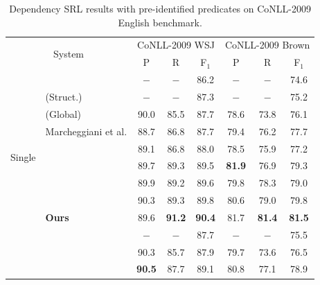 \documentclass[letterpaper]{article} %
\begin{document}
\begin{table}[t]
	\centering
	\setlength{\tabcolsep}{10pt}
	\begin{tabular}{llcccccc}
		\toprule  
		\multicolumn{2}{c}{\multirow{2}{*}{System}}&\multicolumn{3}{c}{CoNLL-2009 WSJ}&\multicolumn{3}{c}{CoNLL-2009 Brown}\\  
		\cmidrule(lr){3-5} \cmidrule(lr){6-8}
		&&P&R&F$_1$&P&R&F$_1$ \\  
		\midrule
		\multirow{10}{*}{Single} & \citeauthor{Zhao2009Conll} \shortcite{Zhao2009Conll} &$-$&$-$&86.2&$-$&$-$&74.6 \\
		&\citeauthor{Fitzgerald2015} \shortcite{Fitzgerald2015} \small{(Struct.)} &$-$&$-$&87.3&$-$&$-$&75.2 \\
		&\citeauthor{roth2016} \shortcite{roth2016} \small{(Global)} &90.0&85.5&87.7&78.6&73.8&76.1 \\
		&Marcheggiani et al. \shortcite{marcheggiani2017}  &88.7&86.8&87.7&79.4&76.2&77.7 \\
		&\citeauthor{marcheggianiEMNLP2017} \shortcite{marcheggianiEMNLP2017}&89.1&86.8&88.0&78.5&75.9&77.2 \\
		&\citeauthor{he:2018Syntax} \shortcite{he:2018Syntax} &89.7&89.3&89.5&\textbf{81.9}&76.9&79.3 \\
		&\citeauthor{cai2018full} \shortcite{cai2018full} &89.9&89.2&89.6&79.8&78.3&79.0 \\
		&\citeauthor{li2018unified} \shortcite{li2018unified} &  90.3 & 89.3 & 89.8 &  80.6 & 79.0 & 79.8 \\
		&\textbf{Ours}&89.6&\textbf{91.2}&\textbf{90.4}&81.7&\textbf{81.4}&\textbf{81.5}\\
		\midrule
		\multirow{3}{*}{Ensemble}
		&\citeauthor{Fitzgerald2015} \shortcite{Fitzgerald2015} &$-$&$-$&87.7&$-$&$-$&75.5 \\
		&\citeauthor{roth2016} \shortcite{roth2016} &90.3&85.7&87.9&79.7&73.6&76.5 \\
		&\citeauthor{marcheggianiEMNLP2017} \shortcite{marcheggianiEMNLP2017} &\textbf{90.5}&87.7&89.1&80.8&77.1&78.9 \\ 
		\bottomrule
	\end{tabular}
	\caption{Dependency SRL results with pre-identified predicates on CoNLL-2009 English benchmark.}\label{tab:gold-for-dependency}
\end{table}
\end{document}
